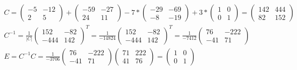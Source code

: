 \documentclass{report}
\begin{document}
\begin{equation}
\begin{split}
	& C = \begin{pmatrix}-5 & -12\\ 2 & 5\end{pmatrix} + \begin{pmatrix}-59 & -27\\24 & 11\end{pmatrix} - 7 * \begin{pmatrix}-29 & -69\\ -8 & -19\end{pmatrix} + 3 * \begin{pmatrix}1 & 0\\ 0 & 1\end{pmatrix} = \begin{pmatrix}142 & 444\\ 82 & 152\end{pmatrix} \\
	& C^{-1}= \frac{1}{\lvert C\rvert} \begin{pmatrix} 152 & -82 \\ -444 &  142 \end{pmatrix}^{T} = \frac{1}{-14824}\begin{pmatrix} 152 & -82 \\ -444 &  142 \end{pmatrix}^{T} = \frac{1}{-7412}\begin{pmatrix} 76 & -222 \\ -41 &  71 \end{pmatrix} \\
	& E = C^{-1}C =\frac{1}{-3706}\begin{pmatrix} 76 & -222 \\ -41 &  71 \end{pmatrix}\begin{pmatrix} 71 & 222 \\ 41 &  76 \end{pmatrix} =  \begin{pmatrix}1 & 0\\ 0 & 1\end{pmatrix}
\end{split}\end{equation}
\end{document}
